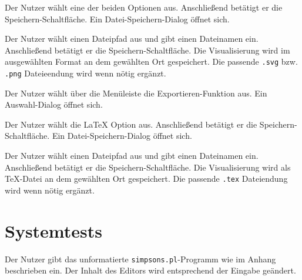 \documentclass[parskip=full,11pt,twoside]{scrartcl}
\begin{document}
{Der Nutzer wählt eine der beiden Optionen aus. Anschließend betätigt er die Speichern-Schaltfläche.}
{Ein Datei-Speichern-Dialog öffnet sich.}

{Der Nutzer wählt einen Dateipfad aus und gibt einen Dateinamen ein. Anschließend betätigt er die Speichern-Schaltfläche.}
{Die Visualisierung wird im ausgewählten Format an dem gewählten Ort gespeichert. Die passende \texttt{.svg} bzw. \texttt{.png} Dateieendung wird wenn nötig ergänzt.}



{Der Nutzer wählt über die Menüleiste die Exportieren-Funktion aus.}
{Ein Auswahl-Dialog öffnet sich.}

{Der Nutzer wählt die LaTeX Option aus. Anschließend betätigt er die Speichern-Schaltfläche.}
{Ein Datei-Speichern-Dialog öffnet sich.}

{Der Nutzer wählt einen Dateipfad aus und gibt einen Dateinamen ein. Anschließend betätigt er die Speichern-Schaltfläche.}
{Die Visualisierung wird als TeX-Datei an dem gewählten Ort gespeichert. Die passende \texttt{.tex} Dateiendung wird wenn nötig ergänzt.}


\section{Systemtests}


{Der Nutzer gibt das unformatierte \texttt{simpsons.pl}-Programm wie im Anhang beschrieben ein.}
{Der Inhalt des Editors wird entsprechend der Eingabe geändert.}
\end{document}
